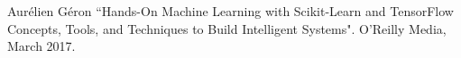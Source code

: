 \documentclass[conference]{IEEEtran}
\begin{document}
\begin{thebibliography}{00}
 Aurélien Géron ``Hands-On Machine Learning with Scikit-Learn and TensorFlow
Concepts, Tools, and Techniques to Build Intelligent Systems". O'Reilly Media, March 2017.
\end{thebibliography}
\end{document}
